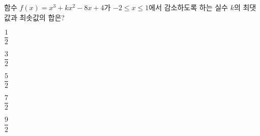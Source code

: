 함수 $f(x)=x^3+kx^2-8x+4$가 $-2\le x\le 1$에서 감소하도록 하는 실수 $k$의 최댓값과 최솟값의 합은?
\begin{choices32}{\rule[-3ex]{0pt}{8ex}$\dfrac{1}{2}$}{\rule[-3ex]{0pt}{8ex}$\dfrac{3}{2}$}{\rule[-3ex]{0pt}{8ex}$\dfrac{5}{2}$}{\rule[-3ex]{0pt}{8ex}$\dfrac{7}{2}$}{\rule[-3ex]{0pt}{8ex}$\dfrac{9}{2}$}\end{choices32}

